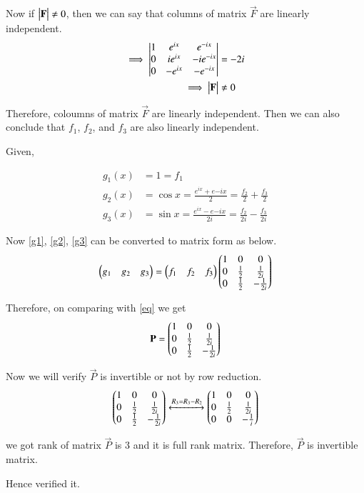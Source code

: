 \documentclass[journal,12pt,twocolumn]{IEEEtran}
\begin{document}
Now if $\mydet{\Vec{F}}\neq0$, then we can say that columns of matrix $\vec{F}$ are linearly independent.
\begin{align}
    \implies\mydet{1&e^{ix}&e^{-ix}\\0&ie^{ix}&-ie^{-ix}\\0&-e^{ix}&-e^{-ix}}&=-2i\\
    \implies\mydet{\Vec{F}}&\neq0
\end{align}

Therefore, coloumns of matrix $\vec{F}$ are linearly independent. Then we can also conclude that $f_1$, $f_2$, and $f_3$ are also linearly independent.

Given,

\begin{align}
    g_1(x)&=1=f_1\label{g1}\\
    g_2(x)&=\cos{x}=\frac{e^{ix}+e{-ix}}{2}=\frac{f_2}{2}+\frac{f_3}{2}\label{g2}\\
    g_3(x)&=\sin{x}=\frac{e^{ix}-e{-ix}}{2i}=\frac{f_2}{2i}-\frac{f_3}{2i}\label{g3}
\end{align}

Now \eqref{g1}, \eqref{g2}, \eqref{g3} can be converted to matrix form as below.
\begin{align}
    \begin{pmatrix}g_1&g_2&g_3\end{pmatrix}=\begin{pmatrix}f_1&f_2&f_3\end{pmatrix}\begin{pmatrix}1&0&0\\0&\frac{1}{2}&\frac{1}{2i}\\0&\frac{1}{2}&-\frac{1}{2i}\end{pmatrix}
\end{align}

Therefore, on comparing with \eqref{eq} we get
\begin{align}
    \mathbf{P}=\begin{pmatrix}1&0&0\\0&\frac{1}{2}&\frac{1}{2i}\\0&\frac{1}{2}&-\frac{1}{2i}\end{pmatrix}
\end{align}

Now we will verify $\Vec{P}$ is invertible or not by row reduction.
\begin{align}
    \begin{pmatrix}1&0&0\\0&\frac{1}{2}&\frac{1}{2i}\\0&\frac{1}{2}&-\frac{1}{2i}\end{pmatrix}\xleftrightarrow{R_3=R_3-R_2}\begin{pmatrix}1&0&0\\0&\frac{1}{2}&\frac{1}{2i}\\0&0&-\frac{1}{i}\end{pmatrix}
\end{align}

we got rank of matrix $\vec{P}$ is 3 and it is full rank matrix. Therefore, $\vec{P}$ is invertible matrix.

Hence verified it.
\end{document}
